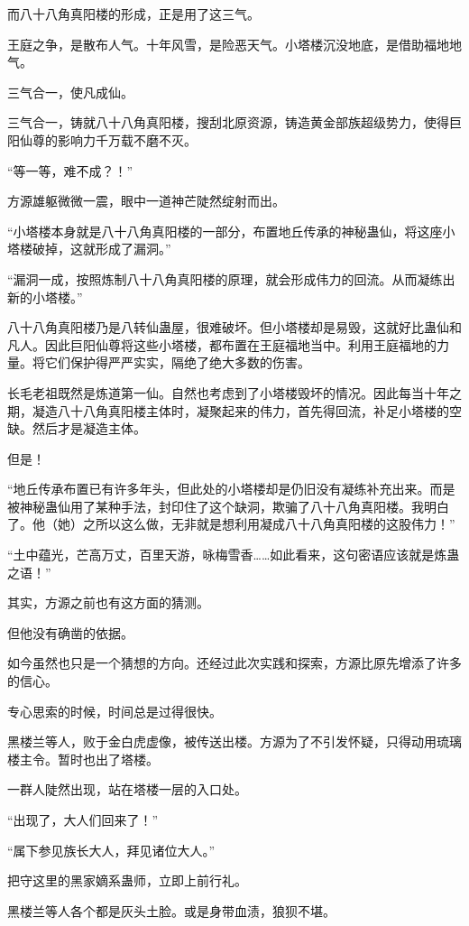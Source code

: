 \begin{this_body}
而八十八角真阳楼的形成，正是用了这三气。

王庭之争，是散布人气。十年风雪，是险恶天气。小塔楼沉没地底，是借助福地地气。

三气合一，使凡成仙。

三气合一，铸就八十八角真阳楼，搜刮北原资源，铸造黄金部族超级势力，使得巨阳仙尊的影响力千万载不磨不灭。

“等一等，难不成？！”

方源雄躯微微一震，眼中一道神芒陡然绽射而出。

“小塔楼本身就是八十八角真阳楼的一部分，布置地丘传承的神秘蛊仙，将这座小塔楼破掉，这就形成了漏洞。”

“漏洞一成，按照炼制八十八角真阳楼的原理，就会形成伟力的回流。从而凝练出新的小塔楼。”

八十八角真阳楼乃是八转仙蛊屋，很难破坏。但小塔楼却是易毁，这就好比蛊仙和凡人。因此巨阳仙尊将这些小塔楼，都布置在王庭福地当中。利用王庭福地的力量。将它们保护得严严实实，隔绝了绝大多数的伤害。

长毛老祖既然是炼道第一仙。自然也考虑到了小塔楼毁坏的情况。因此每当十年之期，凝造八十八角真阳楼主体时，凝聚起来的伟力，首先得回流，补足小塔楼的空缺。然后才是凝造主体。

但是！

“地丘传承布置已有许多年头，但此处的小塔楼却是仍旧没有凝练补充出来。而是被神秘蛊仙用了某种手法，封印住了这个缺洞，欺骗了八十八角真阳楼。我明白了。他（她）之所以这么做，无非就是想利用凝成八十八角真阳楼的这股伟力！”

“土中蕴光，芒高万丈，百里天游，咏梅雪香……如此看来，这句密语应该就是炼蛊之语！”

其实，方源之前也有这方面的猜测。

但他没有确凿的依据。

如今虽然也只是一个猜想的方向。还经过此次实践和探索，方源比原先增添了许多的信心。

专心思索的时候，时间总是过得很快。

黑楼兰等人，败于金白虎虚像，被传送出楼。方源为了不引发怀疑，只得动用琉璃楼主令。暂时也出了塔楼。

一群人陡然出现，站在塔楼一层的入口处。

“出现了，大人们回来了！”

“属下参见族长大人，拜见诸位大人。”

把守这里的黑家嫡系蛊师，立即上前行礼。

黑楼兰等人各个都是灰头土脸。或是身带血渍，狼狈不堪。


\end{this_body}
